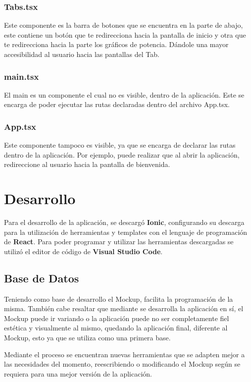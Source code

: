                 \subsubsection{Tabs.tsx}
                    Este componente es la barra de botones que se encuentra en la parte de abajo, este contiene un botón que te redirecciona hacia la pantalla de inicio y otra que te redirecciona hacia la parte los gráficos de potencia. Dándole una mayor accesibilidad al usuario hacia las pantallas del Tab.\par

                \subsubsection{main.tsx}
                    El main es un componente el cual no es visible, dentro de la aplicación. Este se encarga de poder ejecutar las rutas declaradas dentro del archivo App.tsx.\par

                \subsubsection{App.tsx}
                    Este componente tampoco es visible, ya que se encarga de declarar las rutas dentro de la aplicación. Por ejemplo, puede realizar que al abrir la aplicación, redireccione al usuario hacia la pantalla de bienvenida.\par
                
        \section{Desarrollo}
            Para el desarrollo de la aplicación, se descargó \textbf{Ionic}, configurando su descarga para la utilización de herramientas y templates con el lenguaje de programación de \textbf{React}. Para poder programar y utilizar las herramientas descargadas se utilizó el editor de código de \textbf{Visual Studio Code}.\par 
            \subsection{Base de Datos}
                Teniendo como base de desarrollo el Mockup, facilita la programación de la misma. También cabe resaltar que mediante se desarrolla la aplicación en sí, el Mockup puede ir variando o la aplicación puede no ser completamente fiel estética y visualmente al mismo, quedando la aplicación final, diferente al Mockup, esto ya que se utiliza como una primera base.\par 
                Mediante el proceso se encuentran nuevas herramientas que se adapten mejor a las necesidades del momento, reescribiendo o modificando el Mockup según se requiera para una mejor versión de la aplicación.\par
                
